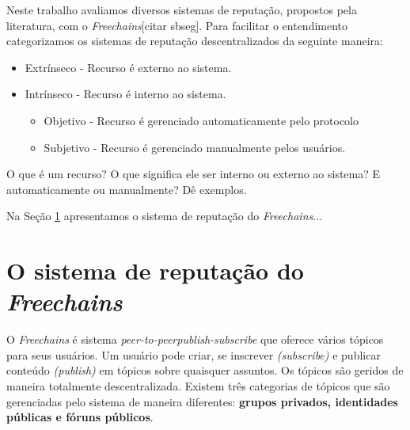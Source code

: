 \documentclass[12pt]{article}
\newcommand{\FC} {\emph{Freechains}\xspace}
\newcommand{\PtoP} {\emph{peer-to-peer}\xspace}
\begin{document}
Neste trabalho avaliamos diversos sistemas de reputação, propostos pela literatura, com o \FC [citar sbseg].
Para facilitar o entendimento categorizamos os sistemas de reputação descentralizados da seguinte maneira:

\begin{itemize}
    \item Extrínseco - Recurso é externo ao sistema.
    \item Intrínseco - Recurso é interno ao sistema.
    \begin{itemize}
        \item Objetivo - Recurso é gerenciado automaticamente pelo protocolo
        \item Subjetivo - Recurso é gerenciado manualmente pelos usuários.
    \end{itemize}
\end{itemize}

O que é um recurso?
O que significa ele ser interno ou externo ao sistema?
E automaticamente ou manualmente?
Dê exemplos.

Na Seção \ref{sec:freechains} apresentamos o sistema de reputação do \FC...

\section{O sistema de reputação do \FC} \label{sec:freechains}

O \FC é sistema \PtoP \emph{publish-subscribe} que oferece vários tópicos para seus usuários. %
Um usuário pode criar, se inscrever \emph{(subscribe)} e publicar conteúdo \emph{(publish)} em tópicos sobre quaisquer assuntos.
Os tópicos são geridos de maneira totalmente descentralizada.
Existem três categorias de tópicos que são gerenciadas pelo sistema de maneira diferentes:
\textbf{grupos privados, identidades públicas e fóruns públicos}. 
\end{document}

